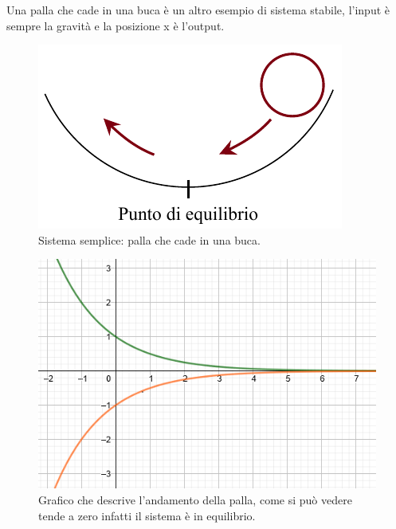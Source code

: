 	\begin{nexample}
			Una palla che cade in una buca è un altro esempio di sistema stabile, l'input è sempre la gravità e la posizione x è l'output. 
		
		\begin{figure}[H]
			\centering
			\includegraphics[scale=0.5]{immagini/cap3_Sistemi/pallaBuca}
			\caption{ Sistema semplice: palla che cade in una buca. }
			\label{fig: pallaBuca}
		\end{figure}
		
		\begin{figure}[H]
			\centering
			\includegraphics[scale=0.5]{immagini/esp3}
			\caption{ Grafico che descrive l'andamento della palla, come si può vedere tende a zero infatti il sistema è in equilibrio. }
			\label{fig: esp3}
		\end{figure}
	\end{nexample}
	
